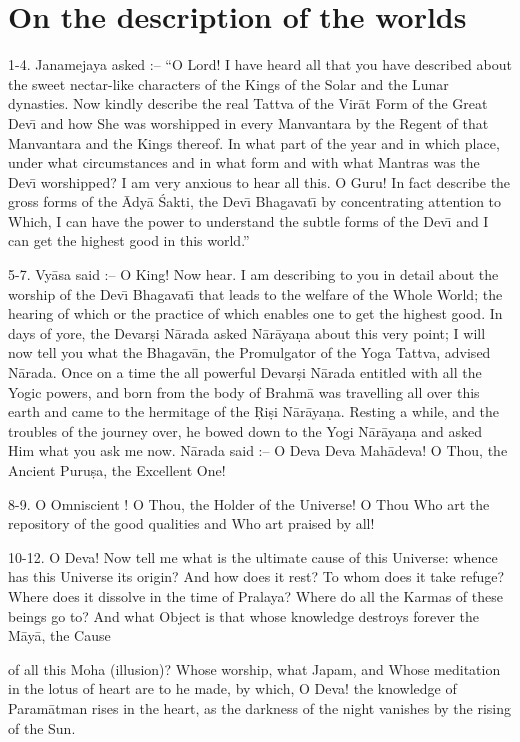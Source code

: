 \chapter{On the description of the worlds}

1-4. Janamejaya asked :-- ``O Lord! I have heard all that you have described about the sweet nectar-like characters of the Kings of the Solar and the Lunar dynasties. Now kindly describe the real Tattva of the Vir\=at Form of the Great Dev\={\i} and how She was worshipped in every Manvantara by the Regent of that Manvantara and the Kings thereof. In what part of the year and in which place, under what circumstances and in what form and with what Mantras was the Dev\={\i} worshipped? I am very anxious to hear all this. O Guru! In fact describe the gross forms of the \=Ady\=a \'Sakti, the Dev\={\i} Bhagavat\={\i} by concentrating attention to Which, I can have the power to understand the subtle forms of the Dev\={\i} and I can get the highest good in this world.''

5-7. Vy\=asa said :-- O King! Now hear. I am describing to you in detail about the worship of the Dev\={\i} Bhagavat\={\i} that leads to the welfare of the Whole World; the hearing of which or the practice of which enables one to get the highest good. In days of yore, the Devar\d{s}i N\=arada asked N\=ar\=aya\d{n}a about this very point; I will now tell you what the Bhagav\=an, the Promulgator of the Yoga Tattva, advised N\=arada. Once on a time the all powerful Devar\d{s}i N\=arada entitled with all the Yogic powers, and born from the body of Brahm\=a was travelling all over this earth and came to the hermitage of the \d{R}i\d{s}i N\=ar\=aya\d{n}a. Resting a while, and the troubles of the journey over, he bowed down to the Yogi N\=ar\=aya\d{n}a and asked Him what you ask me now. N\=arada said :-- O Deva Deva Mah\=adeva! O Thou, the Ancient Puru\d{s}a, the Excellent One!

8-9. O Omniscient ! O Thou, the Holder of the Universe! O Thou Who art the repository of the good qualities and Who art praised by all!

10-12. O Deva! Now tell me what is the ultimate cause of this Universe: whence has this Universe its origin? And how does it rest? To whom does it take refuge? Where does it dissolve in the time of Pralaya? Where do all the Karmas of these beings go to? And what Object is that whose knowledge destroys forever the M\=ay\=a, the Cause

of all this Moha (illusion)? Whose worship, what Japam, and Whose meditation in the lotus of heart are to he made, by which, O Deva! the knowledge of Param\=atman rises in the heart, as the darkness of the night vanishes by the rising of the Sun.


